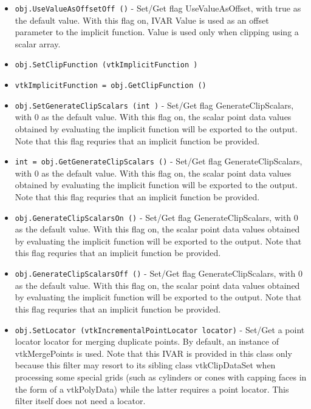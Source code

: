 \begin{itemize}
\item  \verb|obj.UseValueAsOffsetOff ()| -  Set/Get flag UseValueAsOffset, with true as the default value. With this flag
 on, IVAR Value is used as an offset parameter to the implicit function. Value 
 is used only when clipping using a scalar array.

\item  \verb|obj.SetClipFunction (vtkImplicitFunction )|

\item  \verb|vtkImplicitFunction = obj.GetClipFunction ()|

\item  \verb|obj.SetGenerateClipScalars (int )| -  Set/Get flag GenerateClipScalars, with 0 as the default value. With this
 flag on, the scalar point data values obtained by evaluating the implicit
 function will be exported to the output. Note that this flag requries that
 an implicit function be provided.

\item  \verb|int = obj.GetGenerateClipScalars ()| -  Set/Get flag GenerateClipScalars, with 0 as the default value. With this
 flag on, the scalar point data values obtained by evaluating the implicit
 function will be exported to the output. Note that this flag requries that
 an implicit function be provided.

\item  \verb|obj.GenerateClipScalarsOn ()| -  Set/Get flag GenerateClipScalars, with 0 as the default value. With this
 flag on, the scalar point data values obtained by evaluating the implicit
 function will be exported to the output. Note that this flag requries that
 an implicit function be provided.

\item  \verb|obj.GenerateClipScalarsOff ()| -  Set/Get flag GenerateClipScalars, with 0 as the default value. With this
 flag on, the scalar point data values obtained by evaluating the implicit
 function will be exported to the output. Note that this flag requries that
 an implicit function be provided.

\item  \verb|obj.SetLocator (vtkIncrementalPointLocator locator)| -  Set/Get a point locator locator for merging duplicate points. By default, 
 an instance of vtkMergePoints is used. Note that this IVAR is provided
 in this class only because this filter may resort to its sibling class
 vtkClipDataSet when processing some special grids (such as cylinders or
 cones with capping faces in the form of a vtkPolyData) while the latter
 requires a point locator. This filter itself does not need a locator.


\end{itemize}
